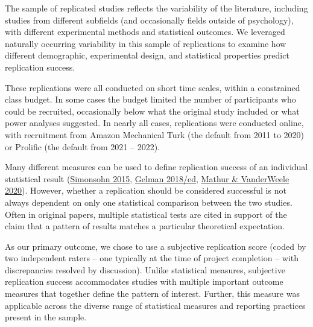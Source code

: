 \documentclass[
  english,
  a4paper,
]{article}
\begin{document}
The sample of replicated studies reflects the variability of the literature, including studies from different subfields (and occasionally fields outside of psychology), with different experimental methods and statistical outcomes. We leveraged naturally occurring variability in this sample of replications to examine how different demographic, experimental design, and statistical properties predict replication success.

These replications were all conducted on short time scales, within a constrained class budget. In some cases the budget limited the number of participants who could be recruited, occasionally below what the original study included or what power analyses suggested. In nearly all cases, replications were conducted online, with recruitment from Amazon Mechanical Turk (the default from 2011 to 2020) or Prolific (the default from 2021 -- 2022).

Many different measures can be used to define replication success of an individual statistical result (\protect\hyperlink{ref-simonsohn2015}{Simonsohn 2015}, \protect\hyperlink{ref-gelman2018}{Gelman 2018/ed}, \protect\hyperlink{ref-mathur2020}{Mathur \& VanderWeele 2020}). However, whether a replication should be considered successful is not always dependent on only one statistical comparison between the two studies. Often in original papers, multiple statistical tests are cited in support of the claim that a pattern of results matches a particular theoretical expectation.

As our primary outcome, we chose to use a subjective replication score (coded by two independent raters -- one typically at the time of project completion -- with discrepancies resolved by discussion). Unlike statistical measures, subjective replication success accommodates studies with multiple important outcome measures that together define the pattern of interest. Further, this measure was applicable across the diverse range of statistical measures and reporting practices present in the sample.
\end{document}
